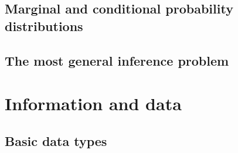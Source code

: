 \documentclass[
  a4paper,
  DIV=11,
  numbers=noendperiod,
  oneside]{scrreprt}
\begin{document}
\hypertarget{marginal-and-conditional-probability-distributions}{%
\chapter{Marginal and conditional probability
distributions}\label{marginal-and-conditional-probability-distributions}}

\providecommand{\ul}{\uline}
\renewcommand*{\|}[1][]{\nonscript\:#1\vert\nonscript\:\mathopen{}}
\providecommand*{\pr}[1]{\textsf{\small`#1'}}
\renewcommand*{\pr}[1]{\textsf{\small`#1'}}
\providecommand*{\prq}[1]{\textsf{\small #1}}

\providecommand{\se}[1]{\mathsfit{#1}}
\renewcommand{\se}[1]{\mathsfit{#1}}
\providecommand{\p}{\mathrm{p}}
\renewcommand{\p}{\mathrm{p}}
\renewcommand{\P}{\mathrm{P}}

\providecommand*{\mo}[1][=]{\mathord{\,#1\,}}
\providecommand*{\yX}{\se{X}}
\providecommand*{\yY}{\se{Y}}
\providecommand*{\yI}{\se{I}}
\providecommand*{\yi}[1][]{\se{I}_{\text{#1}}}
\providecommand{\di}{\mathrm{d}}

\hypertarget{the-most-general-inference-problem}{%
\chapter{The most general inference
problem}\label{the-most-general-inference-problem}}

\part{Information and data}

\hypertarget{sec-data-types-basic}{%
\chapter{Basic data types}\label{sec-data-types-basic}}

\providecommand{\ul}{\uline}
\renewcommand*{\|}[1][]{\nonscript\:#1\vert\nonscript\:\mathopen{}}
\providecommand*{\pr}[1]{\textsf{\small`#1'}}
\renewcommand*{\pr}[1]{\textsf{\small`#1'}}
\providecommand*{\prq}[1]{\textsf{\small #1}}
\end{document}
